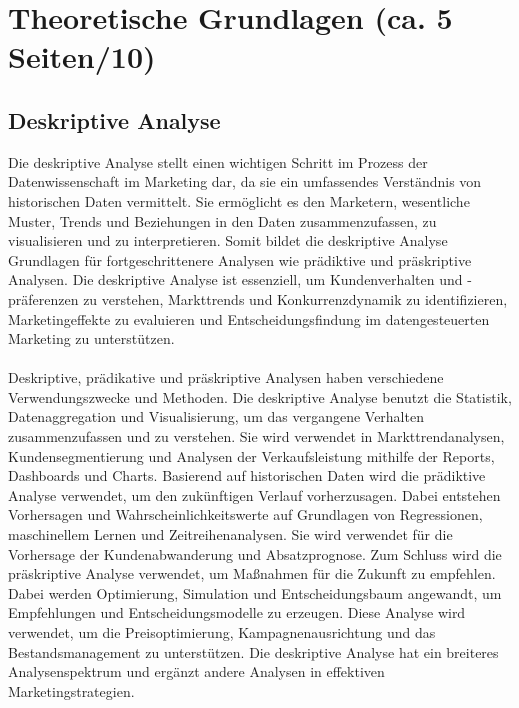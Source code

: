 \newpage
\section{Theoretische Grundlagen (ca. 5 Seiten/10)}
\subsection{Deskriptive Analyse}
\label{deskriptiveanalyse}
Die deskriptive Analyse stellt einen wichtigen Schritt im Prozess der Datenwissenschaft im Marketing dar, da sie ein umfassendes Verständnis von historischen Daten vermittelt. Sie ermöglicht es den Marketern, wesentliche Muster, Trends und Beziehungen in den Daten zusammenzufassen, zu visualisieren und zu interpretieren. Somit bildet die deskriptive Analyse Grundlagen für fortgeschrittenere Analysen wie prädiktive und präskriptive Analysen. Die deskriptive Analyse ist essenziell, um Kundenverhalten und -präferenzen zu verstehen, Markttrends und Konkurrenzdynamik zu identifizieren, Marketingeffekte zu evaluieren und Entscheidungsfindung im datengesteuerten Marketing zu unterstützen\cite{brown2024mastering}. \\\\
Deskriptive, prädikative und präskriptive Analysen haben verschiedene Verwendungszwecke und Methoden. Die deskriptive Analyse benutzt die Statistik, Datenaggregation und Visualisierung, um das vergangene Verhalten zusammenzufassen und zu verstehen. Sie wird verwendet in Markttrendanalysen, Kundensegmentierung und Analysen der Verkaufsleistung mithilfe der Reports, Dashboards und Charts. Basierend auf historischen Daten wird die prädiktive Analyse verwendet, um den zukünftigen Verlauf vorherzusagen. Dabei entstehen Vorhersagen und Wahrscheinlichkeitswerte auf Grundlagen von Regressionen, maschinellem Lernen und Zeitreihenanalysen. Sie wird verwendet für die Vorhersage der Kundenabwanderung und Absatzprognose. Zum Schluss wird die präskriptive Analyse verwendet, um Maßnahmen für die Zukunft zu empfehlen. Dabei werden Optimierung, Simulation und Entscheidungsbaum angewandt, um Empfehlungen und Entscheidungsmodelle zu erzeugen. Diese Analyse wird verwendet, um die Preisoptimierung, Kampagnenausrichtung und das Bestandsmanagement zu unterstützen. Die deskriptive Analyse hat ein breiteres Analysenspektrum und ergänzt andere Analysen in effektiven Marketingstrategien\cite[S. 51 ff]{brown2024mastering}. 


